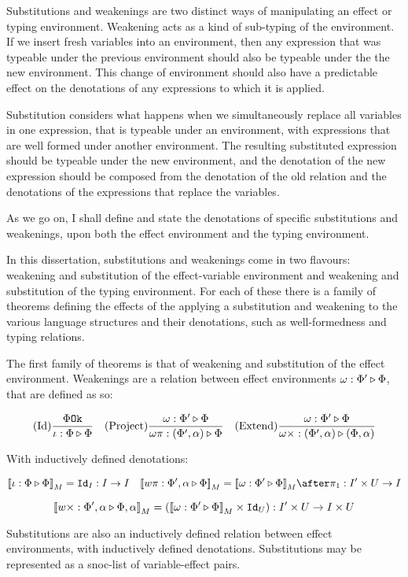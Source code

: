 \documentclass{Report}
\begin{document}
Substitutions and weakenings are two distinct ways of manipulating an effect or typing environment. Weakening acts as a kind of sub-typing of the environment. If we insert fresh variables into an environment, then any expression that was typeable under the previous environment should also be typeable under the the new environment. This change of environment should also have a predictable effect on the denotations of any expressions to which it is applied.

Substitution considers what happens when we simultaneously replace all variables in one expression, that is typeable under an environment, with expressions that are well formed under another environment. The resulting substituted expression should be typeable under the new environment, and the denotation of the new expression should be composed from the denotation of the old relation and the denotations of the expressions that replace the variables. 

As we go on, I shall define and state the denotations of specific substitutions and weakenings, upon both the effect environment and the typing environment.

In this dissertation, substitutions and weakenings come in two flavours: weakening and substitution of the effect-variable environment and weakening and substitution of the typing environment. For each of these there is a family of theorems defining the effects of the applying a substitution and weakening to the various language structures and their denotations, such as well-formedness and typing relations.


The first family of theorems is that of weakening and substitution of the effect environment. Weakenings are a relation between effect environments $\omega : \Phi' \triangleright \Phi$, that are defined as so:

\[
    (\text{Id}) \frac{\Phi \texttt{Ok}}{\iota : \Phi \triangleright \Phi}
    \quad
    (\text{Project}) \frac{\omega : \Phi' \triangleright \Phi}{\omega\pi : (\Phi', \alpha) \triangleright \Phi}
    \quad
    (\text{Extend}) \frac{\omega : \Phi' \triangleright \Phi}{\omega\times : (\Phi', \alpha) \triangleright (\Phi, \alpha)}
\]

With inductively defined denotations: 

\[
    \deno{\wrel{\i}{\P}{\P}} = \Id{I}: I \rightarrow I
    \quad
    \deno{\wrel{w\pi}{\P',\a}{\P}} = \deno{\wrelw{\P'}{\P}}\after \p: I'\times U\rightarrow I
\]

\[
    {\bf [\![}w\times : \Phi',\alpha \triangleright \Phi,\alpha{\bf ]\!]}_M = ({\bf [\![}\omega : \Phi' \triangleright \Phi{\bf ]\!]}_M\times \texttt{Id}_{U}): I'\times U\rightarrow I\times U    
\]

Substitutions are also an inductively defined relation between effect environments, with inductively defined denotations. Substitutions may be represented as a snoc-list of variable-effect pairs.
\end{document}
